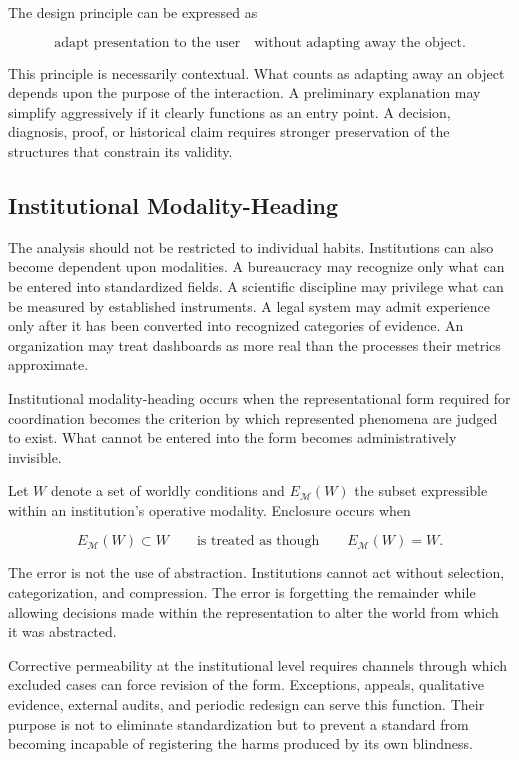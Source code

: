 \documentclass[11pt]{article}
\newcommand{\modality}{\mathcal{M}}
\begin{document}
The design principle can be expressed as

\begin{equation}
  \text{adapt presentation to the user}
  \quad\text{without adapting away the object}.
  \label{eq:adaptation-principle}
\end{equation}

This principle is necessarily contextual. What counts as adapting away an
object depends upon the purpose of the interaction. A preliminary explanation
may simplify aggressively if it clearly functions as an entry point. A
decision, diagnosis, proof, or historical claim requires stronger preservation
of the structures that constrain its validity.

\subsection{Institutional Modality-Heading}

The analysis should not be restricted to individual habits. Institutions can
also become dependent upon modalities. A bureaucracy may recognize only what
can be entered into standardized fields. A scientific discipline may privilege
what can be measured by established instruments. A legal system may admit
experience only after it has been converted into recognized categories of
evidence. An organization may treat dashboards as more real than the
processes their metrics approximate.

Institutional modality-heading occurs when the representational form required
for coordination becomes the criterion by which represented phenomena are
judged to exist. What cannot be entered into the form becomes administratively
invisible.

Let \(W\) denote a set of worldly conditions and \(E_{\modality}(W)\) the
subset expressible within an institution's operative modality. Enclosure
occurs when

\begin{equation}
  E_{\modality}(W)
  \subset W
  \qquad\text{is treated as though}\qquad
  E_{\modality}(W)=W.
  \label{eq:institutional-enclosure}
\end{equation}

The error is not the use of abstraction. Institutions cannot act without
selection, categorization, and compression. The error is forgetting the
remainder while allowing decisions made within the representation to alter
the world from which it was abstracted.

Corrective permeability at the institutional level requires channels through
which excluded cases can force revision of the form. Exceptions, appeals,
qualitative evidence, external audits, and periodic redesign can serve this
function. Their purpose is not to eliminate standardization but to prevent a
standard from becoming incapable of registering the harms produced by its own
blindness.
\end{document}

